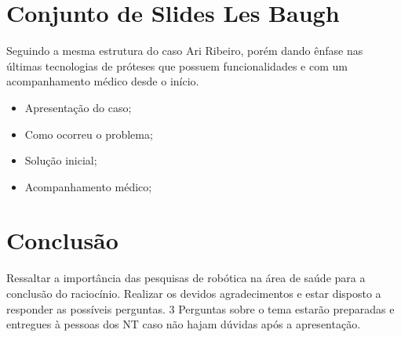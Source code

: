 \documentclass[12pt,a4paper]{article}
\begin{document}
    \section{Conjunto de Slides Les Baugh}
    Seguindo a mesma estrutura do caso Ari Ribeiro, porém dando ênfase nas últimas tecnologias de próteses que possuem funcionalidades e com um acompanhamento médico desde o início.
    \begin{itemize}
        \item Apresentação do caso;
        \item Como ocorreu o problema;
        \item Solução inicial;
        \item Acompanhamento médico;
    \end{itemize}

    \section{Conclusão}
    Ressaltar a importância das pesquisas de robótica na área de saúde para a conclusão do raciocínio. Realizar os devidos agradecimentos e estar disposto a responder as possíveis perguntas.
    3 Perguntas sobre o tema estarão preparadas e entregues à pessoas dos NT caso não hajam dúvidas após a apresentação.
\end{document}
